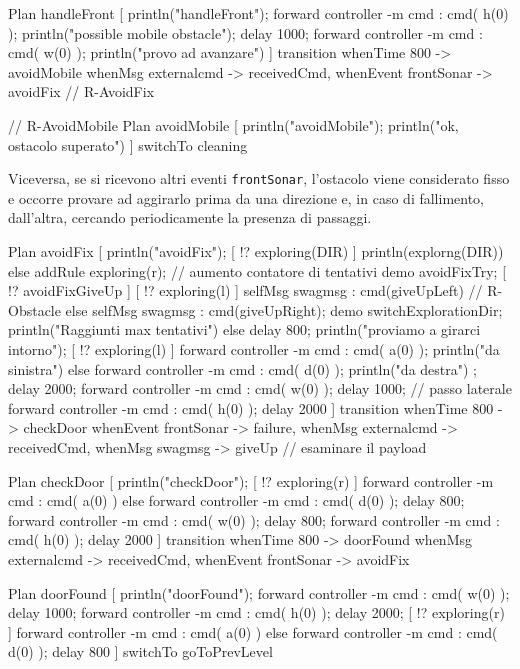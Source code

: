 \documentclass{../llncs}
\newcommand{\codescript}[1]{{\mbox{\small{\texttt{#1}}}}\xspace}
\begin{document}
\begin{qacode}[caption={SoftwareAgent, pt6}]
Plan handleFront [
	println("handleFront");
	forward controller -m cmd : cmd( h(0) );
	println("possible mobile obstacle");
	delay 1000;
	forward controller -m cmd : cmd( w(0) );
	println("provo ad avanzare")
]
transition
	whenTime 800 -> avoidMobile
	whenMsg externalcmd -> receivedCmd,
	whenEvent frontSonar -> avoidFix // R-AvoidFix
 
 // R-AvoidMobile
 Plan avoidMobile [
	println("avoidMobile");
	println("ok, ostacolo superato")
]
switchTo cleaning
\end{qacode}

Viceversa, se si ricevono altri eventi \codescript{frontSonar}, l'ostacolo viene considerato fisso e occorre provare ad aggirarlo prima da una direzione e, in caso di fallimento, dall'altra, cercando periodicamente la presenza di passaggi.\\

\begin{qacode}[caption={SoftwareAgent, pt7}]
Plan avoidFix [
	println("avoidFix");
	[ !? exploring(DIR) ] println(explorng(DIR))
	else addRule exploring(r);
	// aumento contatore di tentativi
	demo avoidFixTry;
	[ !? avoidFixGiveUp ] {
		[ !? exploring(l) ] selfMsg swagmsg : cmd(giveUpLeft) // R-Obstacle
		else selfMsg swagmsg : cmd(giveUpRight);
		demo switchExplorationDir;
		println("Raggiunti max tentativi")
	} else {
		delay 800;
		println("proviamo a girarci intorno");
		[ !? exploring(l) ] {
			forward controller -m cmd : cmd( a(0) );
			println("da sinistra")
		}
		else {
			forward controller -m cmd : cmd( d(0) );
			println("da destra")
		};
		delay 2000;
		forward controller -m cmd : cmd( w(0) );
		delay 1000; // passo laterale
		forward controller -m cmd : cmd( h(0) );
		delay 2000
	}
]
transition whenTime 800 -> checkDoor
	whenEvent frontSonar -> failure,
	whenMsg externalcmd -> receivedCmd,
	whenMsg swagmsg -> giveUp // esaminare il payload

Plan checkDoor [
	println("checkDoor");
	[ !? exploring(r) ] forward controller -m cmd : cmd( a(0) )
	else forward controller -m cmd : cmd( d(0) );
	delay 800;
	forward controller -m cmd : cmd( w(0) );
	delay 800;
	forward controller -m cmd : cmd( h(0) );
	delay 2000
]
transition whenTime 800 -> doorFound
	whenMsg externalcmd -> receivedCmd,
	whenEvent frontSonar -> avoidFix

Plan doorFound [
	println("doorFound");
	forward controller -m cmd : cmd( w(0) );
	delay 1000;
	forward controller -m cmd : cmd( h(0) );
	delay 2000;
	[ !? exploring(r) ] forward controller -m cmd : cmd( a(0) )
	else forward controller -m cmd : cmd( d(0) );
	delay 800
]
switchTo goToPrevLevel
\end{qacode}
\end{document}
